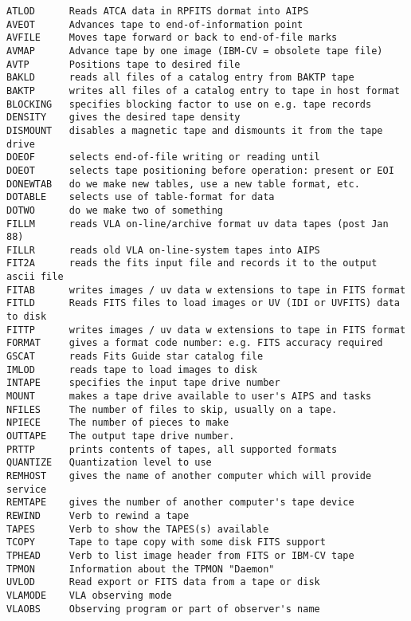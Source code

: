 \vskip 0.5pt
\bbve\begin{verbatim}
ATLOD      Reads ATCA data in RPFITS dormat into AIPS
AVEOT      Advances tape to end-of-information point
AVFILE     Moves tape forward or back to end-of-file marks
AVMAP      Advance tape by one image (IBM-CV = obsolete tape file)
AVTP       Positions tape to desired file
BAKLD      reads all files of a catalog entry from BAKTP tape
BAKTP      writes all files of a catalog entry to tape in host format
BLOCKING   specifies blocking factor to use on e.g. tape records
DENSITY    gives the desired tape density
DISMOUNT   disables a magnetic tape and dismounts it from the tape drive
DOEOF      selects end-of-file writing or reading until
DOEOT      selects tape positioning before operation: present or EOI
DONEWTAB   do we make new tables, use a new table format, etc.
DOTABLE    selects use of table-format for data
DOTWO      do we make two of something
FILLM      reads VLA on-line/archive format uv data tapes (post Jan 88)
FILLR      reads old VLA on-line-system tapes into AIPS
FIT2A      reads the fits input file and records it to the output ascii file
FITAB      writes images / uv data w extensions to tape in FITS format
FITLD      Reads FITS files to load images or UV (IDI or UVFITS) data to disk
FITTP      writes images / uv data w extensions to tape in FITS format
FORMAT     gives a format code number: e.g. FITS accuracy required
GSCAT      reads Fits Guide star catalog file
IMLOD      reads tape to load images to disk
INTAPE     specifies the input tape drive number
MOUNT      makes a tape drive available to user's AIPS and tasks
NFILES     The number of files to skip, usually on a tape.
NPIECE     The number of pieces to make
OUTTAPE    The output tape drive number.
PRTTP      prints contents of tapes, all supported formats
QUANTIZE   Quantization level to use
REMHOST    gives the name of another computer which will provide service
REMTAPE    gives the number of another computer's tape device
REWIND     Verb to rewind a tape
TAPES      Verb to show the TAPES(s) available
TCOPY      Tape to tape copy with some disk FITS support
TPHEAD     Verb to list image header from FITS or IBM-CV tape
TPMON      Information about the TPMON "Daemon"
UVLOD      Read export or FITS data from a tape or disk
VLAMODE    VLA observing mode
VLAOBS     Observing program or part of observer's name
\end{verbatim}\eve

\vfill\eject
{}


